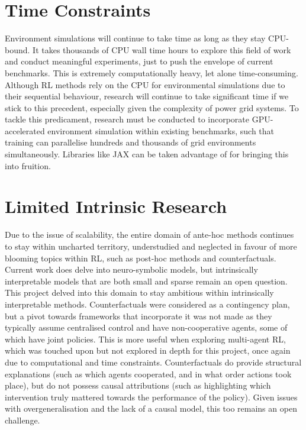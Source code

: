 \section{Time Constraints}

% 


Environment simulations will continue to take time as long as they stay CPU-bound. It takes thousands of CPU wall time hours to explore this field of work and conduct meaningful experiments, just to push the envelope of current benchmarks. This is extremely computationally heavy, let alone time-consuming. Although RL methods rely on the CPU for environmental simulations due to their sequential behaviour, research will continue to take significant time if we stick to this precedent, especially given the complexity of power grid systems. To tackle this predicament, research must be conducted to incorporate GPU-accelerated environment simulation within existing benchmarks, such that training can parallelise hundreds and thousands of grid environments simultaneously. Libraries like JAX can be taken advantage of for bringing this into fruition.

\section{Limited Intrinsic Research}


Due to the issue of scalability, the entire domain of ante-hoc methods continues to stay within uncharted territory, understudied and neglected in favour of more blooming topics within RL, such as post-hoc methods and counterfactuals. Current work does delve into neuro-symbolic models, but intrinsically interpretable models that are both small and sparse remain an open question. This project delved into this domain to stay ambitious within intrinsically interpretable methods. Counterfactuals were considered as a contingency plan, but a pivot towards frameworks that incorporate it was not made as they typically assume centralised control and have non-cooperative agents, some of which have joint policies. This is more useful when exploring multi-agent RL, which was touched upon but not explored in depth for this project, once again due to computational and time constraints. Counterfactuals do provide structural explanations (such as which agents cooperated, and in what order actions took place), but do not possess causal attributions (such as highlighting which intervention truly mattered towards the performance of the policy). Given issues with overgeneralisation and the lack of a causal model, this too remains an open challenge. 


